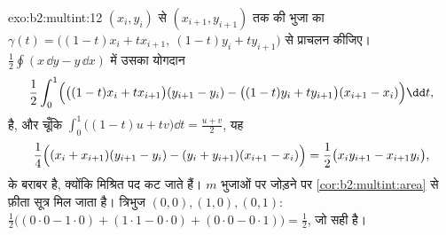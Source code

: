 \begin{solution}{exo:b2:multint:12}
$(x_i, y_i)$ से $(x_{i+1}, y_{i+1})$ तक की भुजा का $\gamma(t) = \bigl((1-t)x_i + tx_{i+1},\ (1-t)y_i +
ty_{i+1}\bigr)$ से प्राचलन कीजिए। $\frac12\oint(x\,\dd y - y\,\dd x)$ में उसका
योगदान
\[
\frac12\int_0^1\Bigl(\bigl((1-t)x_i +
tx_{i+1}\bigr)(y_{i+1} - y_i) - \bigl((1-t)y_i +
ty_{i+1}\bigr)(x_{i+1} - x_i)\Bigr)\dd t ,
\]
है, और चूँकि $\int_0^1\bigl((1-t)u + tv\bigr)\dd t = \frac{u +
v}2$, यह
\[
\frac14\Bigl((x_i + x_{i+1})(y_{i+1} - y_i) - (y_i +
y_{i+1})(x_{i+1} - x_i)\Bigr)
= \frac12\bigl(x_iy_{i+1} - x_{i+1}y_i\bigr),
\]
के बराबर है, क्योंकि मिश्रित पद कट जाते हैं। $m$ भुजाओं पर जोड़ने
पर \cref{cor:b2:multint:area} से फ़ीता सूत्र मिल जाता है। त्रिभुज $(0,0), (1,0), (0,1)$: $\frac12\bigl((0\cdot0 - 1\cdot0) +
(1\cdot1 - 0\cdot0) + (0\cdot0 - 0\cdot1)\bigr) = \frac12$, जो सही
 है।
\end{solution}

